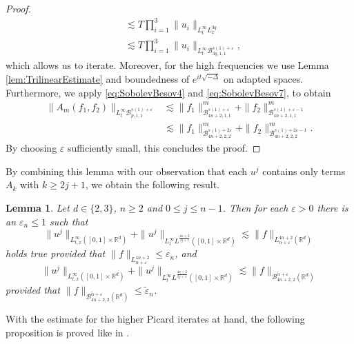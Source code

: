 \documentclass{amsart}
\newtheorem{lemma}[theorem]{Lemma}
\theoremstyle{definition}
\newcommand{\R}{\mathbb{R}}
\newcommand {\veps}{\varepsilon}
\numberwithin{equation}{section}
\begin{document}
{\begin{proof}
\begin{equation*}
\begin{split}
&\lesssim T \prod_{i=1}^3 \| u_i \|_{L_t^\infty L_x^{3q}} \\
&\lesssim T \prod_{i=1}^3 \| u_i \|_{L_t^\infty \mathcal{B}^{s(1)+\varepsilon}_{3q,1,1}},
\end{split}
\end{equation*}
which allows us to iterate. Moreover, for the high frequencies we use Lemma \ref{lem:TrilinearEstimate} and boundedness of $e^{it \sqrt{-\Delta}}$ on adapted spaces. Furthermore, we apply \eqref{eq:SobolevBesov4} and \eqref{eq:SobolevBesov7}, to obtain
\begin{equation*}
\begin{split}
\| A_m (f_1,f_2) \|_{L_t^\infty \mathcal{B}^{s(1)+\veps}_{p,1,1}} &\lesssim \| f_1 \|^m_{\mathcal{B}^{s(1)+\veps}_{4n+2,1,1}} + \| f_2 \|^m_{\mathcal{B}^{s(1)+\veps-1}_{4n+2,1,1}} \\
&\lesssim \| f_1 \|^m_{\mathcal{B}^{s(1)+2\veps}_{4n+2,2,2}} + \| f_2 \|^m_{\mathcal{B}^{s(1)+2\veps-1}_{4n+2,2,2}}.
\end{split}
\end{equation*}
By choosing $\veps$ sufficiently small, this concludes the proof.
\end{proof}

By combining this lemma with our observation that each $u^j$ contains only terms $A_k$ with $k \geq 2j+1$, we obtain the following result. 

\begin{lemma}
Let $d \in \{ 2, 3 \}$, $n \geq 2$ and $0 \leq j \leq n-1$. Then for each $\varepsilon >0$ there is an $\varepsilon_n \leq 1$ such that
\begin{equation*}
\| u^j \|_{L^\infty_{t,x}([0,1] \times \R^d)} + \| u^j \|_{L_t^\infty L^{\frac{4n+2}{2j+1}}([0,1] \times \R^d)} \lesssim \| f \|_{L^{4n+2}_{\alpha + \varepsilon}(\R^d)}
\end{equation*}
holds true provided that $\| f \|_{L^{4n+2}_{\alpha + \varepsilon}} \leq \varepsilon_n$, and
\begin{equation*}
\| u^j \|_{L^\infty_{t,x}([0,1] \times \R^d)} + \| u^j \|_{L^\infty_t L^{\frac{4n+2}{2j+1}}([0,1] \times \R^d)} \lesssim \| f \|_{\mathcal{B}^{\tilde{\alpha}+\varepsilon}_{4n+2,2}(\R^d)}
\end{equation*}
provided that $\| f \|_{\mathcal{B}^{\tilde{\alpha}+\varepsilon}_{4n+2,2}(\R^d)} \leq \tilde{\varepsilon}_n$.
\end{lemma}

With the estimate for the higher Picard iterates at hand, the following proposition is proved like in \cite[Proposition~4.6]{Schippa2022}.


}
\end{document}
